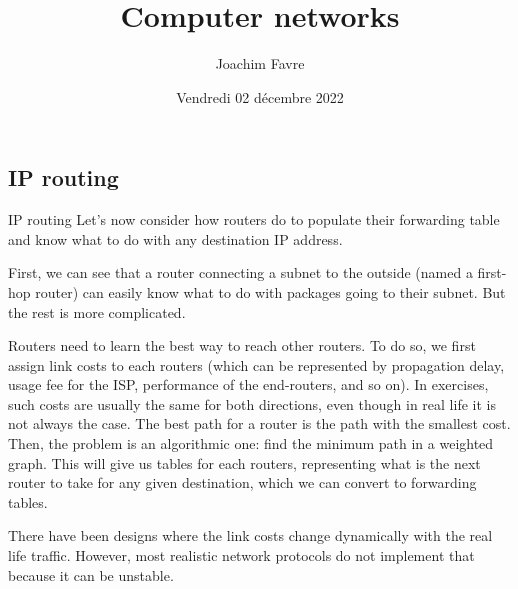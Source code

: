 \documentclass[a4paper]{article}
\title{Computer networks}
\author{Joachim Favre}
\date{Vendredi 02 décembre 2022}
\begin{document}
\maketitle


\subsection{IP routing}
\begin{parag}{IP routing}
    Let's now consider how routers do to populate their forwarding table and know what to do with any destination IP address.

    First, we can see that a router connecting a subnet to the outside (named a first-hop router) can easily know what to do with packages going to their subnet. But the rest is more complicated.

    Routers need to learn the best way to reach other routers. To do so, we first assign link costs to each routers (which can be represented by propagation delay, usage fee for the ISP, performance of the end-routers, and so on). In exercises, such costs are usually the same for both directions, even though in real life it is not always the case. The best path for a router is the path with the smallest cost. Then, the problem is an algorithmic one: find the minimum path in a weighted graph. This will give us tables for each routers, representing what is the next router to take for any given destination, which we can convert to forwarding tables.


    There have been designs where the link costs change dynamically with the real life traffic. However, most realistic network protocols do not implement that because it can be unstable.
\end{parag}
\end{document}
